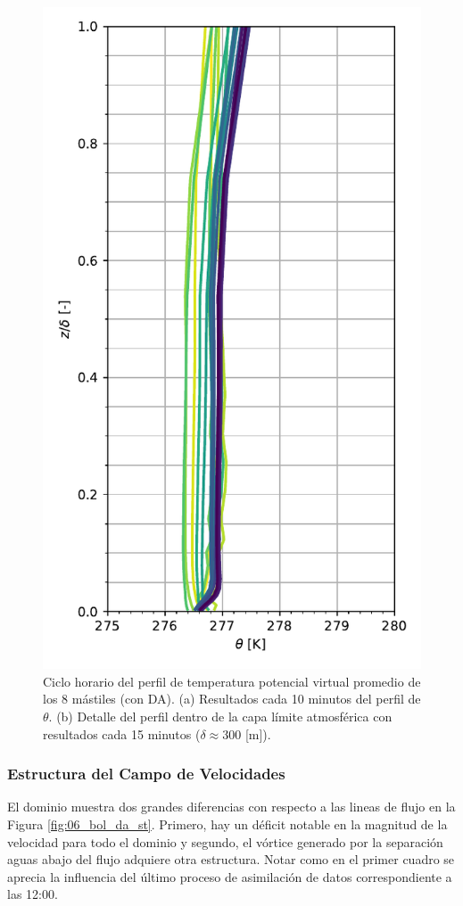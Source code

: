 \begin{figure}[H]
	\begin{minipage}{0.5\linewidth}
		\centering
		\includegraphics[width=0.9\linewidth,trim={0cm 5mm 0cm 0cm},clip]{Imagenes/06/bol_da/mean_profile}%
	\end{minipage}%
	
	\caption{Ciclo horario del perfil de temperatura potencial virtual promedio de los 8 mástiles (con DA). (a) Resultados cada 10 minutos del perfil de $\theta$. (b) Detalle del perfil dentro de la capa límite atmosférica con resultados cada 15 minutos ($\delta\approx300$ [m]).}
	\label{fig:06_bol_da_pbl}
\end{figure}
\subsubsection{Estructura del Campo de Velocidades}
El dominio muestra dos grandes diferencias con respecto a las lineas de flujo en la Figura \ref{fig:06_bol_da_st}. Primero, hay un déficit notable en la magnitud de la velocidad para todo el dominio y segundo, el vórtice generado por la separación aguas abajo del flujo adquiere otra estructura. Notar como en el primer cuadro se aprecia la influencia del último proceso de asimilación de datos correspondiente a las 12:00.

